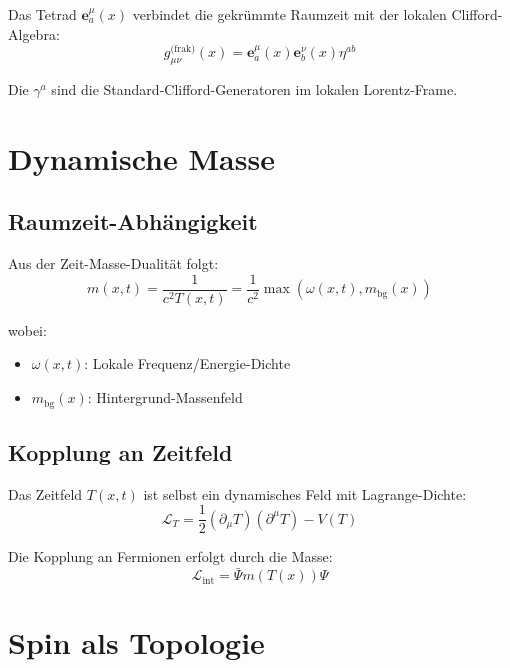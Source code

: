 	Das Tetrad $\mathbf{e}^\mu_a(x)$ verbindet die gekrümmte Raumzeit mit der lokalen 
	Clifford-Algebra:
	\begin{equation}
		g_{\mu\nu}^{\text{(frak)}}(x) = \mathbf{e}^\mu_a(x) \mathbf{e}^\nu_b(x) \eta^{ab}
		\label{eq:tetrad_metric}
	\end{equation}
	
	Die $\gamma^a$ sind die Standard-Clifford-Generatoren im lokalen Lorentz-Frame.
	
	\section{Dynamische Masse}
	
	\subsection{Raumzeit-Abhängigkeit}
	
	Aus der Zeit-Masse-Dualität folgt:
	\begin{equation}
		m(x,t) = \frac{1}{c^2 T(x,t)} = \frac{1}{c^2} \max(\omega(x,t), m_{\text{bg}}(x))
		\label{eq:dynamic_mass}
	\end{equation}
	
	wobei:
	\begin{itemize}
		\item $\omega(x,t)$: Lokale Frequenz/Energie-Dichte
		\item $m_{\text{bg}}(x)$: Hintergrund-Massenfeld
	\end{itemize}
	
	\subsection{Kopplung an Zeitfeld}
	
	Das Zeitfeld $T(x,t)$ ist selbst ein dynamisches Feld mit Lagrange-Dichte:
	\begin{equation}
		\mathcal{L}_T = \frac{1}{2}(\partial_\mu T)(\partial^\mu T) - V(T)
		\label{eq:time_lagrangian}
	\end{equation}
	
	Die Kopplung an Fermionen erfolgt durch die Masse:
	\begin{equation}
		\mathcal{L}_{\text{int}} = \bar{\Psi} m(T(x)) \Psi
		\label{eq:fermion_time_coupling}
	\end{equation}
	
	\section{Spin als Topologie}
	
